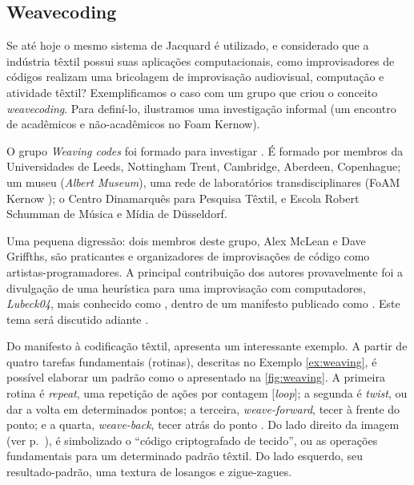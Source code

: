\newpage

\subsection{Weavecoding}\label{sec:weavecoding}

Se até hoje o mesmo sistema de Jacquard é utilizado, e considerado que a indústria têxtil possui suas aplicações computacionais, como improvisadores de códigos realizam uma bricolagem de improvisação audiovisual, computação e atividade têxtil? Exemplificamos o caso com um grupo que criou o conceito \emph{weavecoding}. Para definí-lo, ilustramos uma investigação informal (um encontro de acadêmicos e não-acadêmicos no Foam Kernow).

O grupo \emph{Weaving codes} foi formado para  investigar . É formado por membros da Universidades de Leeds, Nottingham Trent, Cambridge, Aberdeen, Copenhague; um museu (\emph{Albert Museum}), uma rede de laboratórios transdisciplinares (FoAM Kernow ); o Centro Dinamarquês para Pesquisa Têxtil, e Escola Robert Schumman de Música e Mídia de  Düsseldorf. 

Uma pequena digressão: dois membros deste grupo, Alex McLean e Dave Griffths, são praticantes e organizadores de improvisações de código como artistas-programadores. A principal contribuição dos autores provavelmente foi a divulgação de uma heurística para uma improvisação com computadores, \emph{Lubeck04}, mais conhecido como , dentro de um manifesto publicado como  \cite{ward_live_2004}. Este tema será discutido adiante .

Do manifesto à codificação têxtil,  apresenta um interessante exemplo. A partir de quatro tarefas fundamentais (rotinas), descritas no Exemplo \autoref{ex:weaving}, é possível elaborar um padrão como o apresentado na \autoref{fig:weaving}. A primeira rotina é \emph{repeat}, uma repetição de ações por contagem $[$\emph{loop}$]$; a segunda é \emph{twist}, ou dar a volta em determinados pontos; a terceira,  \emph{weave-forward}, tecer à frente do ponto; e a quarta, \emph{weave-back}, tecer atrás do ponto . Do lado direito da imagem (ver p.~\pageref{fig:weaving}), é simbolizado o ``código criptografado de tecido'', ou as operações fundamentais para um determinado padrão têxtil. Do lado esquerdo, seu resultado-padrão, uma textura de losangos e zigue-zagues.  

